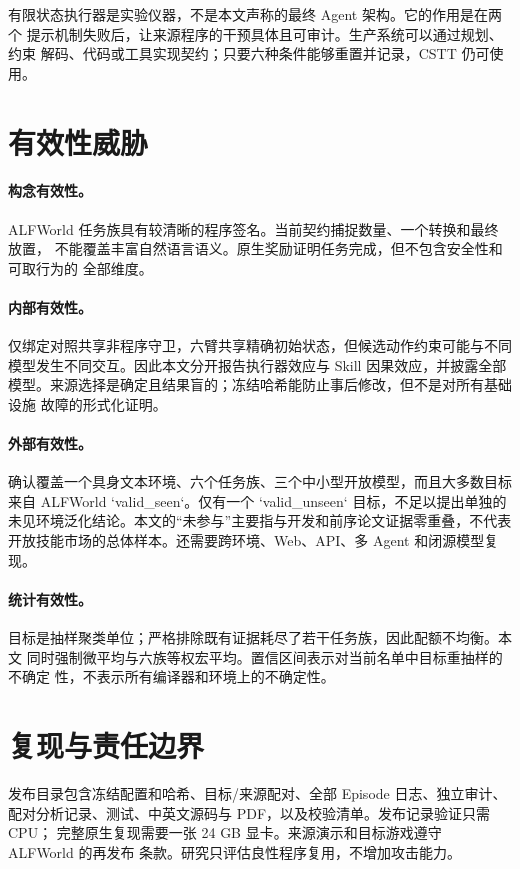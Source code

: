 \documentclass[10pt]{article}
\begin{document}
有限状态执行器是实验仪器，不是本文声称的最终 Agent 架构。它的作用是在两个
提示机制失败后，让来源程序的干预具体且可审计。生产系统可以通过规划、约束
解码、代码或工具实现契约；只要六种条件能够重置并记录，CSTT 仍可使用。

\section{有效性威胁}
\paragraph{构念有效性。}
ALFWorld 任务族具有较清晰的程序签名。当前契约捕捉数量、一个转换和最终放置，
不能覆盖丰富自然语言语义。原生奖励证明任务完成，但不包含安全性和可取行为的
全部维度。

\paragraph{内部有效性。}
仅绑定对照共享非程序守卫，六臂共享精确初始状态，但候选动作约束可能与不同
模型发生不同交互。因此本文分开报告执行器效应与 Skill 因果效应，并披露全部
模型。来源选择是确定且结果盲的；冻结哈希能防止事后修改，但不是对所有基础设施
故障的形式化证明。

\paragraph{外部有效性。}
确认覆盖一个具身文本环境、六个任务族、三个中小型开放模型，而且大多数目标
来自 ALFWorld `valid\_seen`。仅有一个 `valid\_unseen` 目标，不足以提出单独的
未见环境泛化结论。本文的“未参与”主要指与开发和前序论文证据零重叠，不代表
开放技能市场的总体样本。还需要跨环境、Web、API、多 Agent 和闭源模型复现。

\paragraph{统计有效性。}
目标是抽样聚类单位；严格排除既有证据耗尽了若干任务族，因此配额不均衡。本文
同时强制微平均与六族等权宏平均。置信区间表示对当前名单中目标重抽样的不确定
性，不表示所有编译器和环境上的不确定性。

\section{复现与责任边界}
发布目录包含冻结配置和哈希、目标/来源配对、全部 Episode 日志、独立审计、
配对分析记录、测试、中英文源码与 PDF，以及校验清单。发布记录验证只需 CPU；
完整原生复现需要一张 24 GB 显卡。来源演示和目标游戏遵守 ALFWorld 的再发布
条款。研究只评估良性程序复用，不增加攻击能力。
\end{document}
